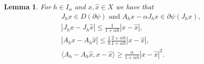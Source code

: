 \documentclass[a4paper,11pt, leqno]{scrreprt} %
\renewcommand{\leq}{\leqslant}
\renewcommand{\leq}{\leqslant}
\renewcommand{\geq}{\geqslant}
\theoremstyle{change}
\newcounter{acounter}[chapter]
\newtheorem{lemma}[acounter]{Lemma}
\theoremstyle{nonumberplain}
\begin{document}
\begin{lemma}\label{lem:jhahestimates}
For $h \in I_\alpha$ and $x, \hat x \in X$ we have that
\begin{align}
&J_h x \in D(\partial \psi) \text{ and } A_h x - \alpha J_h x
\in \partial \psi(J_h x),\label{eq:lemjhah1}\\
&|J_h x - J_h \hat x| \leq \frac{1}{1 + \alpha h} |x - \hat x|,\label{eq:lemjhah2}\\
&|A_h x - A_h \hat x| \leq \frac1h \frac{2 + \alpha h}{1 + \alpha h}
|x - \hat x|,\label{eq:lemjhah3}\\
&\langle A_h  - A_h \hat x, x - \hat x \rangle \geq \frac{\alpha}{1 +
  \alpha h} |x - \hat x|^2\label{eq:lemjhah4}.
\end{align}
\end{lemma}
\end{document}
